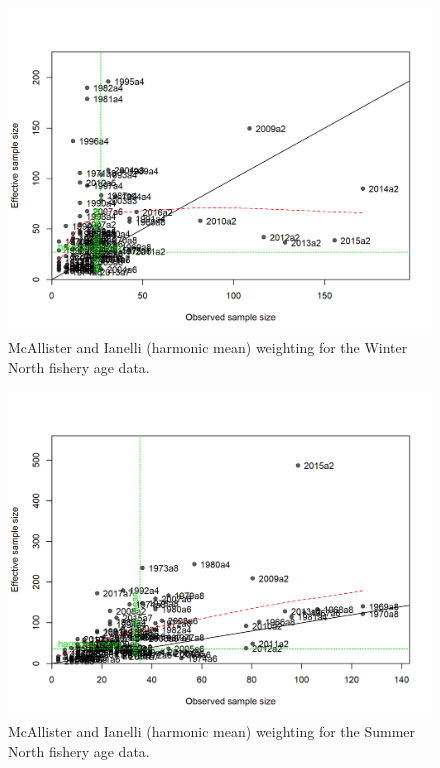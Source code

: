 \documentclass[12pt,]{article}
\begin{document}
\begin{figure}
\centering
\includegraphics{r4ss/plots_mod1/comp_agefit_sampsize_flt1mkt2.png}
\caption{McAllister and Ianelli (harmonic mean) weighting for the Winter
North fishery age data. \label{fig:harm_mean_wn_age}}
\end{figure}

\FloatBarrier

\begin{figure}
\centering
\includegraphics{r4ss/plots_mod1/comp_agefit_sampsize_flt2mkt2.png}
\caption{McAllister and Ianelli (harmonic mean) weighting for the Summer
North fishery age data. \label{fig:harm_mean_sn_age}}
\end{figure}
\end{document}
